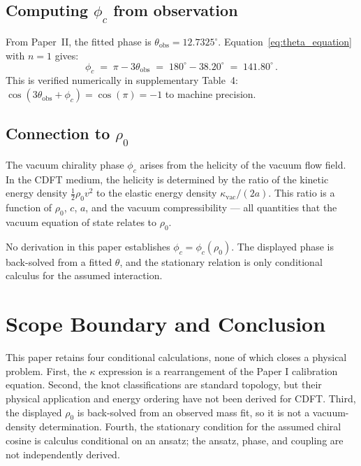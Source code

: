 \documentclass[11pt]{article}
\begin{document}
\subsection{Computing $\phi_c$ from observation}

From Paper~II, the fitted phase is $\theta_\text{obs} = 12.7325^\circ$.
Equation~\eqref{eq:theta_equation} with $n = 1$ gives:
\begin{equation}
  \phi_c \;=\; \pi - 3\theta_\text{obs}
  \;=\; 180^\circ - 38.20^\circ \;=\; 141.80^\circ\,.
  \label{eq:phi_c}
\end{equation}
This is verified numerically in supplementary Table~4:
$\cos(3\theta_\text{obs} + \phi_c) = \cos(\pi) = -1$ to machine precision.

\subsection{Connection to $\rho_0$}

The vacuum chirality phase $\phi_c$ arises from the helicity of the vacuum
flow field.
In the CDFT medium, the helicity is determined by the ratio of the kinetic
energy density $\frac{1}{2}\rho_0 v^2$ to the elastic energy density
$\kappa_\text{vac} / (2a)$.
This ratio is a function of $\rho_0$, $c$, $a$, and the vacuum
compressibility --- all quantities that the vacuum equation of state relates
to $\rho_0$.

No derivation in this paper establishes $\phi_c=\phi_c(\rho_0)$. The displayed
phase is back-solved from a fitted $\theta$, and the stationary relation is only
conditional calculus for the assumed interaction.


\section{Scope Boundary and Conclusion}
\label{sec:summary}

This paper retains four conditional calculations, none of which closes a
physical problem. First, the $\kappa$ expression is a rearrangement of the
Paper I calibration equation. Second, the knot classifications are standard
topology, but their physical application and energy ordering have not been
derived for CDFT. Third, the displayed $\rho_0$ is back-solved from an observed
mass fit, so it is not a vacuum-density determination. Fourth, the stationary
condition for the assumed chiral cosine is calculus conditional on an ansatz;
the ansatz, phase, and coupling are not independently derived.
\end{document}
